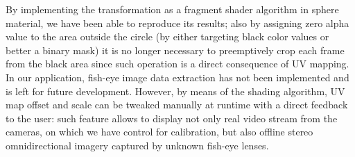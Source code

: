 By implementing the transformation as a fragment shader algorithm in sphere material, we have been able to reproduce its results; also by assigning zero alpha value to the area outside the circle (by either targeting black color values or better a binary mask) it is no longer necessary to preemptively crop each frame from the black area since such operation is a direct consequence of UV mapping.\\
In our application, fish-eye image data extraction has not been implemented and is left for future development. However, by means of the shading algorithm, UV map offset and scale can be tweaked manually at runtime with a direct feedback to the user: such feature allows to display not only real video stream from the cameras, on which we have control for calibration, but also offline stereo omnidirectional imagery captured by unknown fish-eye lenses.

